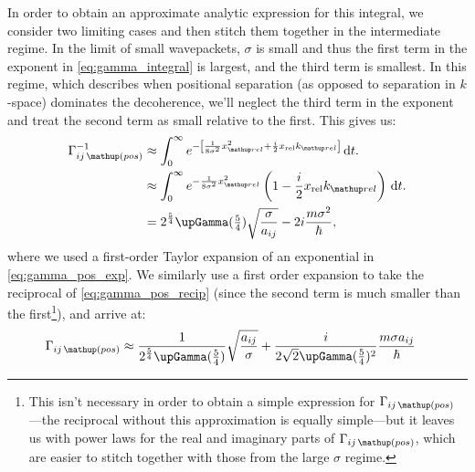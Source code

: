 In order to obtain an approximate analytic expression for this integral, we consider two limiting cases and then stitch them together in the intermediate regime. In the limit of small wavepackets, $\sigma$ is small and thus the first term in the exponent in \eqref{eq:gamma_integral} is largest, and the third term is smallest. In this regime, which describes when positional separation (as opposed to separation in $k$-space) dominates the decoherence, we'll neglect the third term in the exponent and treat the second term as small relative to the first.
This gives us:
\begin{align}
\Gamma_{ij\,\up{(pos)}}^{-1} &\approx \int_0^\infty e^{-\left[
        \frac{1} {8\sigma^2} x_\up{rel}^2
      + \frac i2 x_{\mathrm{rel}} k_\up{rel}
      \right]}\, \dd t.\\
      &\approx \int_0^\infty e^{-
              \frac{1} {8\sigma^2} x_\up{rel}^2}\left(1 - \frac i2 x_{\mathrm{rel}} k_\up{rel}\right)\, \dd t.\label{eq:gamma_pos_exp}\\
      &= 2^{\frac54}\upGamma(\tfrac54)\sqrt{\frac{\sigma}{a_{ij}}} - 2i\frac{m \sigma^2}{\hbar},\label{eq:gamma_pos_recip}
\end{align}
where we used a first-order Taylor expansion of an exponential in \eqref{eq:gamma_pos_exp}. We similarly use a first order expansion to take the reciprocal of \eqref{eq:gamma_pos_recip} (since the second term is much smaller than the first\footnote{This isn't necessary in order to obtain a simple expression for $\Gamma_{ij\,\up{(pos)}}$---the reciprocal without this approximation is equally simple---but it leaves us with power laws for the real and imaginary parts of $\Gamma_{ij\,\up{(pos)}}$, which are easier to stitch together with those from the large $\sigma$ regime.}), and arrive at:
\begin{align}
\Gamma_{ij\,\up{(pos)}} &\approx \frac1{2^{\frac54}\upGamma(\tfrac54)}\sqrt{\frac{a_{ij}}{\sigma}}
+ \frac i {2\sqrt{2}\upGamma(\tfrac54)^2} \frac{m\sigma a_{ij}}{\hbar}\label{eq:gamma_pos_final}%
\end{align}

